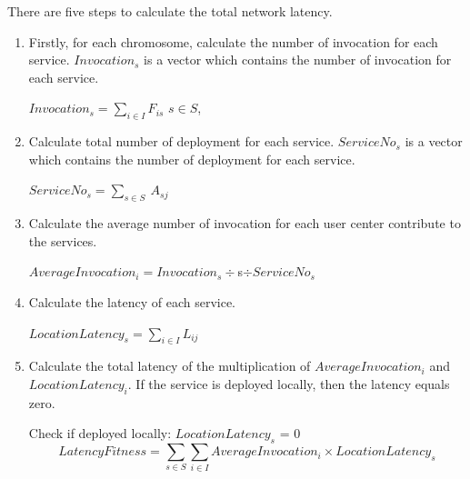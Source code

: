 \documentclass{llncs}
\begin{document}
There are five steps to calculate the total network latency.
\begin{enumerate}
	\item Firstly, for each chromosome, calculate the number of invocation for each service. $Invocation_{s}$ is a vector which contains 
		the number of invocation for each service.
		\begin{center}
			$Invocation_{s} = \sum\limits_{i \in I} F_{is}$ $s \in S$,
		\end{center}
	\item Calculate total number of deployment for each service. $ServiceNo_{s}$ is a vector which contains the number of deployment for each service.
		\begin{center}
			$ServiceNo_{s} = \sum\limits_{s \in S}\ A_{sj}$
		\end{center}
	\item Calculate the average number of invocation for each user center contribute to the services.
		\begin{center}
			$AverageInvocation_{i} = Invocation_{s} \div $s$ \div ServiceNo_{s}$
		\end{center}
	\item Calculate the latency of each service.
		\begin{center}
			$LocationLatency_{s} = \sum\limits_{i \in I} L_{ij}$
		\end{center}
	\item Calculate the total latency of the multiplication of $AverageInvocation_{i}$ and $LocationLatency_{i}$.
		If the service is deployed locally, then the latency equals zero.
		\begin{center}
			Check if deployed locally: $LocationLatency_{s}$ = 0
		\begin{equation}
			LatencyFitness = \sum\limits_{s \in S}\sum\limits_{i \in I} AverageInvocation_{i} \times LocationLatency_{s}
		\end{equation}
		\end{center}
\end{enumerate}
\end{document}
